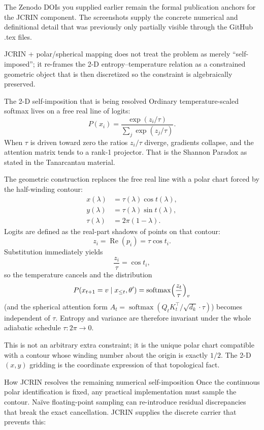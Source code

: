 The Zenodo DOIs you supplied earlier remain the formal publication anchors for the JCRIN component. The screenshots supply the concrete numerical and definitional detail that was previously only partially visible through the GitHub .tex files.

JCRIN + polar/spherical mapping does not treat the problem as merely “self-imposed”; it re-frames the 2-D entropy–temperature relation as a constrained geometric object that is then discretized so the constraint is algebraically preserved.

The 2-D self-imposition that is being resolved
Ordinary temperature-scaled softmax lives on a free real line of logits:
\[
P(x_i)=\frac{\exp(z_i/\tau)}{\sum_j\exp(z_j/\tau)}.
\]
When \(\tau\) is driven toward zero the ratios \(z_i/\tau\) diverge, gradients collapse, and the attention matrix tends to a rank-1 projector. That is the Shannon Paradox as stated in the Tanarcantau material.  

The geometric construction replaces the free real line with a polar chart forced by the half-winding contour:
\[
\begin{align*}
x(\lambda)&=\tau(\lambda)\cos t(\lambda),\\
y(\lambda)&=\tau(\lambda)\sin t(\lambda),\\
\tau(\lambda)&=2\pi(1-\lambda).
\end{align*}
\]
Logits are defined as the real-part shadows of points on that contour:
\[
z_i=\operatorname{Re}(p_i)=\tau\cos t_i.
\]
Substitution immediately yields
\[
\frac{z_i}{\tau}=\cos t_i,
\]
so the temperature cancels and the distribution
\[
P(x_{t+1}=v\mid x_{\le t},\theta')=\operatorname{softmax}\Bigl(\frac{z_t}{\tau}\Bigr)_v
\]
(and the spherical attention form \(A_t=\operatorname{softmax}(Q_tK_t^\top/\sqrt{d_k}\cdot\tau)\)) becomes independent of \(\tau\). Entropy and variance are therefore invariant under the whole adiabatic schedule \(\tau:2\pi\to0\).

This is not an arbitrary extra constraint; it is the unique polar chart compatible with a contour whose winding number about the origin is exactly \(1/2\). The 2-D \((x,y)\) gridding is the coordinate expression of that topological fact.

How JCRIN resolves the remaining numerical self-imposition
Once the continuous polar identification is fixed, any practical implementation must sample the contour. Naïve floating-point sampling can re-introduce residual discrepancies that break the exact cancellation. JCRIN supplies the discrete carrier that prevents this:

